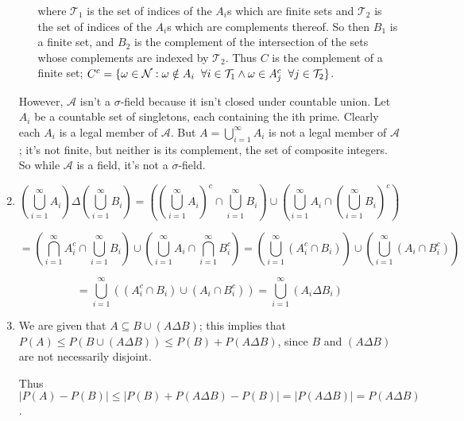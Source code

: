 \documentclass[12pt]{article}
\begin{document}
\begin{enumerate}
\begin{itemize}
where $\mathcal{T}_1$ is the set of indices of the $A_i$s which are finite sets and $\mathcal{T}_2$ is the set of indices of the $A_i$s which are complements thereof. So then $B_1$ is a finite set, and 
$B_2$ is the complement of the intersection of the sets whose complements are indexed by $\mathcal{T}_2$. Thus $C$ is the complement of a finite set; $C^c=\{\omega \in \mathcal{N}: \omega \notin A_i \hspace{2mm} \forall i\in \mathcal{T}_1 \land \omega \in A_j^c \hspace{2mm} \forall j\in \mathcal{T}_2\}$.
\end{itemize}

However, $\mathcal{A}$ isn't a $\sigma$-field because it isn't closed under countable union. Let $A_i$ be a countable set of singletons, each containing the ith prime. Clearly each $A_i$ is a legal member of $\mathcal{A}$. But $A=\bigcup_{i=1}^\infty A_i$ is not a legal member of $\mathcal{A}$; it's not finite, but neither is its complement, the set of composite integers. So while $\mathcal{A}$ is a field, it's not a $\sigma$-field. 

\item $$\left(\bigcup^\infty_{i=1} A_i \right) \Delta \left(\bigcup^\infty_{i=1} B_i \right)=\left( \left( \bigcup^\infty_{i=1} A_i \right)^c \cap \bigcup^\infty_{i=1} B_i \right) \cup \left( \bigcup^\infty_{i=1} A_i \cap \left( \bigcup^\infty_{i=1} B_i \right)^c \right)$$ 

$$=\left(  \bigcap^\infty_{i=1} A_i^c \cap \bigcup^\infty_{i=1} B_i \right) \cup \left( \bigcup^\infty_{i=1} A_i \cap  \bigcap^\infty_{i=1} B_i^c \right)=\left(  \bigcup^\infty_{i=1}( A_i^c \cap B_i )\right) \cup \left( \bigcup^\infty_{i=1} (A_i \cap  B_i^c) \right)$$ 

$$= \bigcup ^\infty_{i=1} \left(\left( A_i^c \cap B_i \right) \cup \left(  A_i \cap B_i^c \right) \right)= \bigcup^\infty_{i=1}(A_i \Delta B_i)$$

\item We are given that $A \subseteq B \cup (A \Delta B)$; this implies that $P(A) \leq P(B \cup (A \Delta B)) \leq P(B)+P(A \Delta B)$, since $B$ and $(A \Delta B)$ are not necessarily disjoint. 

Thus $|P(A)-P(B)|\leq |P(B)+P(A \Delta B)-P(B)|=|P(A \Delta B)|=P(A \Delta B)$.


\end{enumerate}
\end{document}
